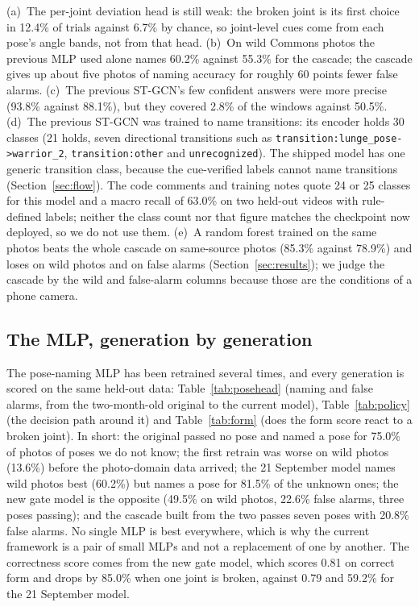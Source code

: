  (a)~The per-joint deviation head is still weak: the broken joint is its first choice in 12.4\% of trials against 6.7\% by chance, so joint-level cues come from each pose's angle bands, not from that head. (b)~On wild Commons photos the previous MLP used alone names 60.2\% against 55.3\% for the cascade; the cascade gives up about five photos of naming accuracy for roughly 60 points fewer false alarms. (c)~The previous ST-GCN's few confident answers were more precise (93.8\% against 88.1\%), but they covered 2.8\% of the windows against 50.5\%. (d)~The previous ST-GCN was trained to name transitions: its encoder holds 30 classes (21 holds, seven directional transitions such as \texttt{transition:lunge\_pose->warrior\_2}, \texttt{transition:other} and \texttt{unrecognized}). The shipped model has one generic transition class, because the cue-verified labels cannot name transitions (Section~\ref{sec:flow}). The code comments and training notes quote 24 or 25 classes for this model and a macro recall of 63.0\% on two held-out videos with rule-defined labels; neither the class count nor that figure matches the checkpoint now deployed, so we do not use them.
(e)~A random forest trained on the same photos beats the whole cascade on same-source photos (85.3\% against 78.9\%) and loses on wild photos and on false alarms (Section~\ref{sec:results}); we judge the cascade by the wild and false-alarm columns because those are the conditions of a phone camera.

\subsection{The MLP, generation by generation}\label{sec:mlp-gens}
The pose-naming MLP has been retrained several times, and every generation is scored on the same held-out data: Table~\ref{tab:posehead} (naming and false alarms, from the two-month-old original to the current model), Table~\ref{tab:policy} (the decision path around it) and Table~\ref{tab:form} (does the form score react to a broken joint). In short: the original passed no pose and named a pose for 75.0\% of photos of poses we do not know; the first retrain was worse on wild photos (13.6\%) before the photo-domain data arrived; the 21 September model names wild photos best (60.2\%) but names a pose for 81.5\% of the unknown ones; the new gate model is the opposite (49.5\% on wild photos, 22.6\% false alarms, three poses passing); and the cascade built from the two passes seven poses with 20.8\% false alarms. No single MLP is best everywhere, which is why the current framework is a pair of small MLPs and not a replacement of one by another. The correctness score comes from the new gate model, which scores 0.81 on correct form and drops by 85.0\% when one joint is broken, against 0.79 and 59.2\% for the 21 September model.


